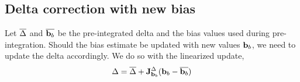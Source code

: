 \subsection{Delta correction with new bias}

Let $\overline{\Delta}$ and $\overline{{\bf b}_b}$ be the pre-integrated delta and the bias values used during pre-integration. Should the bias estimate be updated with new values ${\bf b}_b$, we need to update the delta accordingly. We do so with the linearized update,
%
\begin{align}
\Delta = \overline{\Delta} + {{\bf J}^{\Delta}_{{\bf b}_b}}({\bf b}_b - \overline{{\bf b}_b})
\end{align}

%
%
%
%
%
%
%
%


